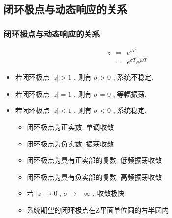 \documentclass[table]{beamer}
\begin{document}
\subsection{闭环极点与动态响应的关系}
\label{sec-7-3}
\begin{frame}
\frametitle{闭环极点与动态响应的关系}
\label{sec-7-3-1}

\begin{eqnarray*}
z & = & e^{sT}\\
 &=& e^{\sigma T}e^{j\omega T}
\end{eqnarray*}

\begin{itemize}
\item 若闭环极点  $|z|>1$  , 则有  $\sigma>0$  , 系统不稳定.
\item 若闭环极点  $|z|=1$  , 则有  $\sigma=0$  , 等幅振荡.
\item 若闭环极点  $|z|<1$  , 则有  $\sigma<0$  , 系统稳定.
\begin{itemize}
\item <2->闭环极点为正实数: 单调收敛
\item <2->闭环极点为负实数: 振荡收敛
\item <2->闭环极点为具有正实部的复数: 低频振荡收敛
\item <2->闭环极点为具有负实部的复数: 高频振荡收敛
\item <2->若  $|z|\rightarrow 0$  ,  $\sigma\rightarrow -\infty$ , 收敛极快
\item <3->系统期望的闭环极点在Z平面单位圆的右半圆内
\end{itemize}
\end{itemize}
\end{frame}
\end{document}
